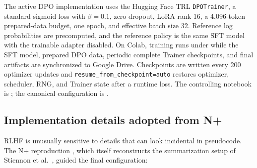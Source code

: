 \documentclass[11pt]{article}
\newcommand{\trl}{\textsc{TRL}}
\begin{document}
The active DPO implementation uses the Hugging Face \trl{}
\texttt{DPOTrainer}, a standard sigmoid loss with $\beta=0.1$, zero dropout,
LoRA rank 16, a 4,096-token prepared-data budget, one epoch, and effective
batch size 32. Reference log probabilities are precomputed, and the reference
policy is the same SFT model with the trainable adapter disabled. On Colab,
training runs under  while the SFT model, prepared DPO data,
periodic complete Trainer checkpoints, and final artifacts are synchronized
to Google Drive. Checkpoints are written every 200 optimizer updates and
\texttt{resume\_from\_checkpoint=auto} restores optimizer, scheduler, RNG, and
Trainer state after a runtime loss. The controlling notebook is
; the canonical configuration is
.

\subsection{Implementation details adopted from N+}

RLHF is unusually sensitive to details that can look incidental in pseudocode.
The N+ reproduction \cite{huang2024}, which itself reconstructs the
summarization setup of Stiennon et al.\ \cite{stiennon2020}, guided the final
configuration:
\end{document}

